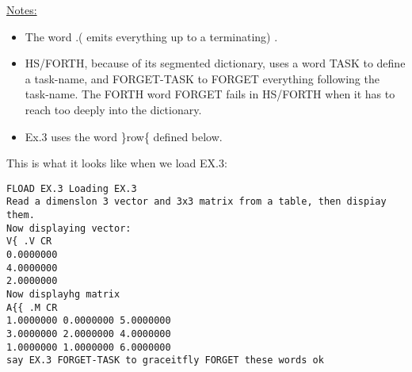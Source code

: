 \underline{Notes:}

\begin{itemize}
  \item The word .( emits everything up to a terminating) .
  \item HS/FORTH, because of its segmented dictionary, uses a word TASK to define a task-name, and FORGET-TASK to FORGET everything following the task-name. The FORTH word FORGET fails in HS/FORTH when it has to reach too deeply into the dictionary.
  \item Ex.3 uses the word \}row\{ defined below.
\end{itemize}

This is what it looks like when we load EX.3:

\begin{verbatim}
FLOAD EX.3 Loading EX.3
Read a dimenslon 3 vector and 3x3 matrix from a table, then dispiay them.
Now displaying vector:
V{ .V CR
0.0000000
4.0000000
2.0000000
Now displayhg matrix 
A{{ .M CR
1.0000000 0.0000000 5.0000000 
3.0000000 2.0000000 4.0000000
1.0000000 1.0000000 6.0000000
say EX.3 FORGET-TASK to graceitfly FORGET these words ok 
\end{verbatim}

